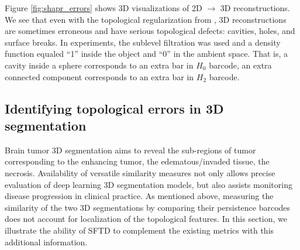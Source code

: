 \documentclass[runningheads]{llncs}
\begin{document}
Figure \ref{fig:shapr_errors} shows 3D visualizations of 2D $\to$ 3D reconstructions. We see that even with the topological regularization from \cite{waibel2022capturing}, 3D reconstructions are sometimes erroneous and have serious topological defects: cavities, holes, and surface breaks. In experiments, the sublevel filtration was used and a density function equaled ``1'' inside the object and ``0'' in the ambient space. That is, a cavity inside a sphere corresponds to an extra bar in $H_0$ barcode, an extra connected component corresponds to an extra bar in $H_2$ barcode.



\subsection{Identifying topological errors in 3D segmentation}


Brain tumor 3D segmentation aims to reveal the sub-regions of tumor corresponding to the enhancing tumor, the edematous/invaded tissue, the necrosis. Availability of versatile similarity measures not only allows precise evaluation of deep learning 3D segmentation models, but also assists monitoring disease progression in clinical practice. As mentioned above, measuring the similarity of the two 3D segmentations by comparing their persistence barcodes does not account for localization of the topological features. In this section, we illustrate the ability of SFTD to complement the existing metrics with this additional information.
\end{document}
